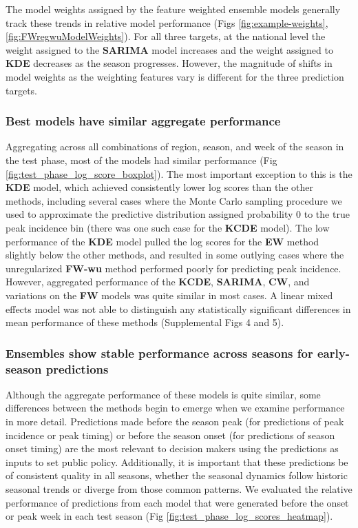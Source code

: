 \documentclass[10pt,letterpaper]{article}
\begin{document}
The model weights assigned by the feature weighted ensemble models
generally track these trends in relative model performance (Figs
\ref{fig:example-weights}, \ref{fig:FWregwuModelWeights}). For all three
targets, at the national level the weight assigned to the
\textbf{SARIMA} model increases and the weight assigned to \textbf{KDE}
decreases as the season progresses. However, the magnitude of shifts in
model weights as the weighting features vary is different for the three
prediction targets.

\subsubsection{Best models have similar aggregate
performance}\label{best-models-have-similar-aggregate-performance}

Aggregating across all combinations of region, season, and week of the
season in the test phase, most of the models had similar performance
(Fig \ref{fig:test_phase_log_score_boxplot}). The most important
exception to this is the \textbf{KDE} model, which achieved consistently
lower log scores than the other methods, including several cases where
the Monte Carlo sampling procedure we used to approximate the predictive
distribution assigned probability 0 to the true peak incidence bin
(there was one such case for the \textbf{KCDE} model). The low
performance of the \textbf{KDE} model pulled the log scores for the
\textbf{EW} method slightly below the other methods, and resulted in
some outlying cases where the unregularized \textbf{FW-wu} method
performed poorly for predicting peak incidence. However, aggregated
performance of the \textbf{KCDE}, \textbf{SARIMA}, \textbf{CW}, and
variations on the \textbf{FW} models was quite similar in most cases. A
linear mixed effects model was not able to distinguish any statistically
significant differences in mean performance of these methods
(Supplemental Figs 4 and 5).

\subsubsection{Ensembles show stable performance across seasons for
early-season
predictions}\label{ensembles-show-stable-performance-across-seasons-for-early-season-predictions}

Although the aggregate performance of these models is quite similar,
some differences between the methods begin to emerge when we examine
performance in more detail. Predictions made before the season peak (for
predictions of peak incidence or peak timing) or before the season onset
(for predictions of season onset timing) are the most relevant to
decision makers using the predictions as inputs to set public policy.
Additionally, it is important that these predictions be of consistent
quality in all seasons, whether the seasonal dynamics follow historic
seasonal trends or diverge from those common patterns. We evaluated the
relative performance of predictions from each model that were generated
before the onset or peak week in each test season (Fig
\ref{fig:test_phase_log_scores_heatmap}).
\end{document}
